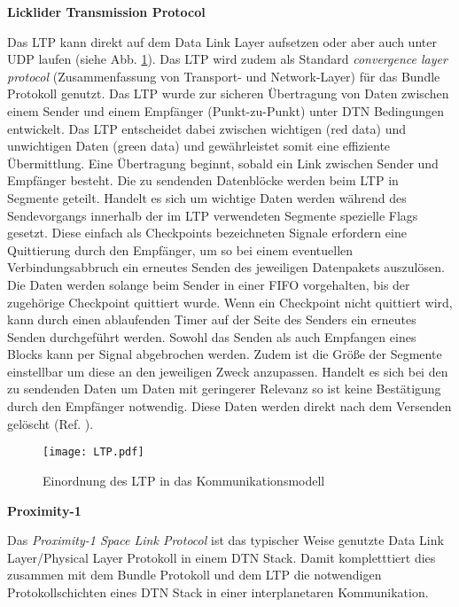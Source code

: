 \textbf{Licklider Transmission Protocol}

Das \gls{LTP} kann direkt auf dem Data Link Layer
aufsetzen oder aber auch unter \gls{UDP} laufen (siehe Abb. \ref{fig:LTP}). Das \gls{LTP}
wird zudem als Standard \textit{convergence layer protocol} (Zusammenfassung von
Transport- und Network-Layer) f{\"u}r das Bundle Protokoll genutzt. Das \gls{LTP}
wurde zur sicheren {\"U}bertragung von Daten zwischen einem Sender und einem
Empf{\"a}nger (Punkt-zu-Punkt) unter \gls{DTN} Bedingungen entwickelt. Das \gls{LTP}
entscheidet dabei zwischen wichtigen (red data) und unwichtigen Daten (green
data) und gew{\"a}hrleistet somit eine effiziente {\"U}bermittlung. Eine
{\"U}bertragung beginnt, sobald ein Link zwischen Sender und Empf{\"a}nger
besteht. Die zu sendenden Datenbl{\"o}cke werden beim \gls{LTP} in Segmente geteilt.
Handelt es sich um wichtige Daten werden w{\"a}hrend des Sendevorgangs
innerhalb der im \gls{LTP} verwendeten Segmente spezielle Flags gesetzt.
Diese einfach als Checkpoints bezeichneten Signale erfordern eine Quittierung
durch den Empf{\"a}nger, um so bei einem eventuellen Verbindungsabbruch ein
erneutes Senden des jeweiligen Datenpakets auszul{\"o}sen. Die Daten werden
solange beim Sender in einer \gls{FIFO} vorgehalten, bis der zugeh{\"o}rige
Checkpoint quittiert wurde. Wenn ein Checkpoint nicht quittiert wird, kann durch
einen ablaufenden Timer auf der Seite des Senders ein erneutes Senden
durchgeführt werden. Sowohl das Senden als auch Empfangen eines Blocks kann per
Signal abgebrochen werden. Zudem ist die Gr{\"o}{\ss}e der Segmente einstellbar um
diese an den jeweiligen Zweck anzupassen. Handelt es sich bei den zu sendenden
Daten um Daten mit geringerer Relevanz so ist keine
Best{\"a}tigung durch den Empf{\"a}nger notwendig.
Diese Daten werden direkt nach dem Versenden gel{\"o}scht (Ref. \cite{web4}).

\begin{figure}[H]
\centering
\texttt{[image: LTP.pdf]}
\caption{Einordnung des LTP in das Kommunikationsmodell}
\label{fig:LTP}
\end{figure}

\textbf{Proximity-1}

Das \textit{Proximity-1 Space Link Protocol} ist das typischer Weise genutzte
Data Link Layer/Physical Layer Protokoll in einem \gls{DTN} Stack. Damit kompletttiert
dies zusammen mit dem Bundle Protokoll und dem \gls{LTP} die notwendigen
Protokollschichten eines \gls{DTN} Stack in einer interplanetaren Kommunikation.

